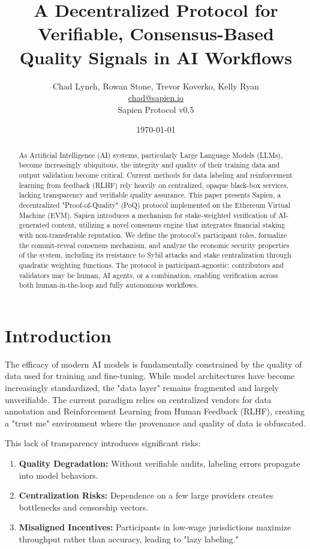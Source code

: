 \documentclass[11pt, a4paper]{article}
\title{\textbf{A Decentralized Protocol for Verifiable, Consensus-Based Quality Signals in AI Workflows}}
\author{Chad Lynch, Rowan Stone, Trevor Koverko, Kelly Ryan \\
\href{mailto:chad@sapien.io}{chad@sapien.io} \\
Sapien Protocol v0.5}
\date{\today}
\begin{document}
\maketitle

\begin{abstract}
As Artificial Intelligence (AI) systems, particularly Large Language Models (LLMs), become increasingly ubiquitous, the integrity and quality of their training data and output validation become critical. Current methods for data labeling and reinforcement learning from feedback (RLHF) rely heavily on centralized, opaque black-box services, lacking transparency and verifiable quality assurance. This paper presents Sapien, a decentralized "Proof-of-Quality" (PoQ) protocol implemented on the Ethereum Virtual Machine (EVM). Sapien introduces a mechanism for stake-weighted verification of AI-generated content, utilizing a novel consensus engine that integrates financial staking with non-transferable reputation. We define the protocol's participant roles, formalize the commit-reveal consensus mechanism, and analyze the economic security properties of the system, including its resistance to Sybil attacks and stake centralization through quadratic weighting functions. The protocol is participant-agnostic: contributors and validators may be human, AI agents, or a combination, enabling verification across both human-in-the-loop and fully autonomous workflows.
\end{abstract}

\section{Introduction}

The efficacy of modern AI models is fundamentally constrained by the quality of data used for training and fine-tuning. While model architectures have become increasingly standardized, the "data layer" remains fragmented and largely unverifiable. The current paradigm relies on centralized vendors for data annotation and Reinforcement Learning from Human Feedback (RLHF), creating a "trust me" environment where the provenance and quality of data is obfuscated.

This lack of transparency introduces significant risks:
\begin{enumerate}
    \item \textbf{Quality Degradation:} Without verifiable audits, labeling errors propagate into model behaviors.
    \item \textbf{Centralization Risks:} Dependence on a few large providers creates bottlenecks and censorship vectors.
    \item \textbf{Misaligned Incentives:} Participants in low-wage jurisdictions maximize throughput rather than accuracy, leading to "lazy labeling."
\end{enumerate}
\end{document}
